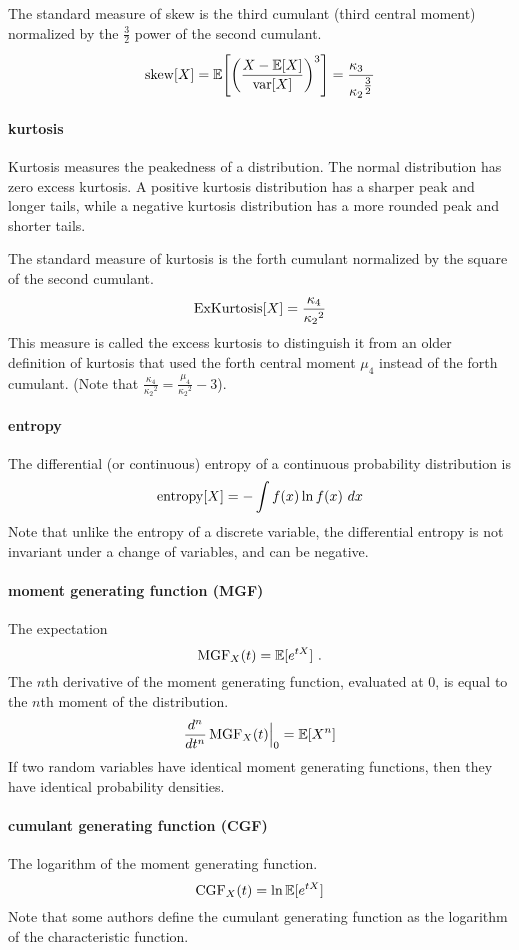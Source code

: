 The standard measure of skew is the third cumulant (third central moment) normalized by the $\tfrac{3}{2}$ power of the second cumulant.
\[
\op{skew}[X]    
=  \expect\Left[ \Left( \frac{X-\expect[X]} {\op{var}[X]} \Right)^3 \Right]
=\frac{\kappa_3\phantom{^{\tfrac{3}{2}}}}{{\kappa_2}^{\tfrac{3}{2}}} 
\notag 
\]


\paragraph*{kurtosis}  Kurtosis measures the peakedness of a distribution. The normal distribution has zero excess kurtosis. A positive kurtosis distribution has a sharper peak and longer tails, while a negative kurtosis distribution has a more rounded peak and shorter tails.

The standard measure of kurtosis is the forth cumulant normalized by the square of the second cumulant.
\[
\operatorname{ExKurtosis}[X] = \frac{\kappa_4}{{\kappa_2}^{2}} 
\notag
\]
This measure is called the excess kurtosis to distinguish it from an older definition of kurtosis that used the forth central moment $\mu_4$ instead of the forth cumulant. (Note that  $\tfrac{\kappa_4}{{\kappa_2}^{2}} =  \frac{\mu_4}{{\kappa_2}^{2}} -3$\checked).


\paragraph*{entropy} 
The differential (or continuous) entropy of a continuous probability distribution is
\[
\operatorname{entropy}[X] = - \int f(x) \ln f(x)\  dx  
\notag
\]
Note that unlike the entropy of a discrete variable, the differential entropy is not invariant under a change of variables, and can be negative. 

\paragraph*{moment generating function (MGF) } 
The expectation
\[
\operatorname{MGF}_X(t) = \operatorname{\mathbb E}[e^{t X}]  \ . 
\notag
\]
The $n$th derivative of the moment generating function, evaluated at $0$, is equal to the $n$th moment of the distribution. 
\[
\frac{d^n}{dt^n}\operatorname{MGF}_X(t)\Big|_0 = \operatorname{\mathbb E}[X^n]  
\notag
\]
If two random variables have identical moment generating functions, then they have identical probability densities.


\paragraph*{cumulant generating function (CGF) }
\label{CGF}
The logarithm of the moment generating function.
\[
\operatorname{CGF}_X(t) = \ln \operatorname{\mathbb E}[e^{t X}] 
\notag
\]
Note that some authors define the cumulant generating function as the logarithm of the characteristic function.

